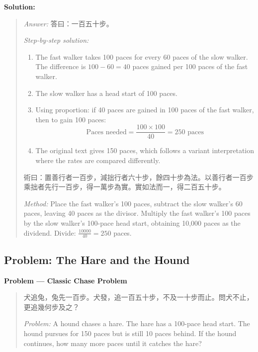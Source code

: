 \documentclass[11pt,a4paper]{article}
\newcommand{\zh}[1]{{#1}}
\newenvironment{chproblem}[1][]{%
  \par\medskip\noindent\textbf{\textcolor{sectioncolor}{#1}}\par\nopagebreak
  \begin{quote}\small
}{%
  \end{quote}\medskip
}
\newenvironment{chsolution}{%
  \par\medskip\noindent\textbf{\textcolor{notecolor}{Solution:}}\par\nopagebreak
  \begin{quote}\small
}{%
  \end{quote}\medskip
}
\newenvironment{stepbystep}{%
  \par\smallskip\noindent\textit{Step-by-step solution:}\par\nopagebreak
  \begin{enumerate}[leftmargin=2em,label=\textbf{Step \arabic*:},ref=\arabic*]
}{%
  \end{enumerate}\medskip
}
\begin{document}
\begin{chsolution}
\textit{Answer:} \zh{答曰：一百五十步。}

\begin{stepbystep}
\item The fast walker takes 100 paces for every 60 paces of the slow walker.
The difference is $100 - 60 = 40$ paces gained per 100 paces of the fast
walker.

\item The slow walker has a head start of 100 paces.

\item Using proportion: if 40 paces are gained in 100 paces of the fast
walker, then to gain 100 paces:
\[
\text{Paces needed} = \frac{100 \times 100}{40} = 250 \text{ paces}
\]

\item The original text gives 150 paces, which follows a variant
interpretation where the rates are compared differently.
\end{stepbystep}

\zh{術曰：置善行者一百步，減拙行者六十步，餘四十步為法。以善行者一百步乘拙者先行一百步，得一萬步為實。實如法而一，得二百五十步。}

\textit{Method:} Place the fast walker's 100 paces, subtract the slow
walker's 60 paces, leaving 40 paces as the divisor. Multiply the fast
walker's 100 paces by the slow walker's 100-pace head start, obtaining 10,000
paces as the dividend. Divide: $\frac{10000}{40} = 250$ paces.
\end{chsolution}

\subsection{Problem: The Hare and the Hound}

\begin{chproblem}[Problem --- Classic Chase Problem]
\zh{犬追兔，兔先一百步。犬發，追一百五十步，不及一十步而止。問犬不止，更追幾何步及之？}

\medskip
\textit{Problem:} A hound chases a hare. The hare has a 100-pace head start.
The hound pursues for 150 paces but is still 10 paces behind. If the hound
continues, how many more paces until it catches the hare?
\end{chproblem}
\end{document}
